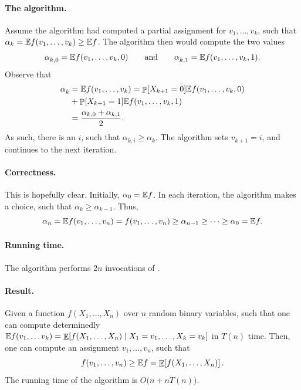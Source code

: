 \paragraph*{The algorithm.}

Assume the algorithm had computed a partial assignment for
$v_1, \ldots, v_k$, such that
$\alpha_k = \mathbb{E} f (v_1, \ldots, v_k) \geq \mathbb{E} f$. The
algorithm then would compute the two values
\begin{equation*}
    \alpha^{}_{k,0} = \ExChar f (v_1, \ldots, v_k, 0)
    \qquad\text{and}\qquad%
    \alpha^{}_{k,1} = \ExChar f (v_1, \ldots, v_k, 1).
\end{equation*}
Observe that
\begin{align*}
    \alpha^{}_k
    &=%
    \ExChar f (v_1, \ldots, v_k)
    =%
    \Prob{X_{k+1} = 0} \ExChar f (v_1, \ldots, v_k,0)
    \\&
    +
    \Prob{X_{k+1} = 1} \ExChar f (v_1, \ldots, v_k,1)
    \\&
    =%
    \frac{\alpha_{k,0} + \alpha_{k,1}}{2}.
\end{align*}
As such, there is an $i$, such that $\alpha_{k,i} \geq \alpha_k$. The
algorithm sets $v_{k+1} = i$, and continues to the next iteration.

\paragraph*{Correctness.} This is hopefully clear. Initially,
$\alpha_0 = \mathbb{E} f$. In each iteration, the algorithm makes a
choice, such that $\alpha_k \geq \alpha_{k-1}$. Thus,
\begin{equation*}
    \alpha_n%
    =
    \ExChar f(v_1, \ldots, v_n)
    =
    f(v_1, \ldots, v_n)
    \geq \alpha_{n-1 } \geq \cdots \geq \alpha_0%
    =%
    \ExChar f.    
\end{equation*}

\paragraph*{Running time.}
The algorithm performs $2n$ invocations of \evalEF{}.

\paragraph*{Result.}

\begin{theorem}
    Given a function $f(X_1, \ldots, X_n)$ over $n$ random binary
    variables, such that one can compute determinedly
    $\mathbb{E} f(v_1, \ldots v_k) = \mathop{\mathbb{E}}\!\left[ f(X_1, \ldots, X_n) \;\middle\vert\; X_1 =
       v_1, \ldots, X_k=v_k \right]$ in $T(n)$ time. Then, one can compute an
    assignment $v_1, \ldots, v_n$, such that
    \begin{equation*}
        f(v_1, \ldots, v_n) \geq \mathbb{E} f = \mathop{\mathbb{E}}\!\left[ { f(X_1, \ldots, X_n)} \right].
    \end{equation*}
     The running time of the algorithm is $O\bigl(n + n T(n)\bigr)$.
\end{theorem}

